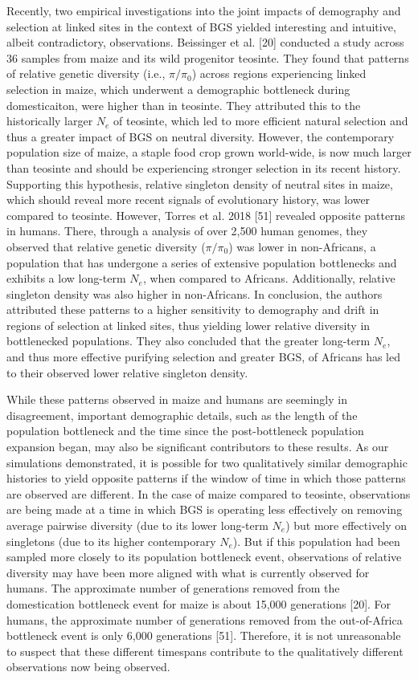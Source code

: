 \documentclass[9pt,twocolumn,twoside]{rilabRxiv}
\begin{document}
Recently, two empirical investigations into the joint impacts of
demography and selection at linked sites in the context of BGS yielded
interesting and intuitive, albeit contradictory, observations.
Beissinger et al. [20] conducted a study across 36 samples from
maize and its wild progenitor teosinte. They found that patterns of
relative genetic diversity (i.e., $\pi/\pi_0$) across regions
experiencing linked selection in maize, which underwent a demographic
bottleneck during domesticaiton, were higher than in teosinte. They
attributed this to the historically larger $N_e$ of
teosinte, which led to more efficient natural selection and thus a
greater impact of BGS on neutral diversity. However, the contemporary
population size of maize, a staple food crop grown world-wide, is now
much larger than teosinte and should be experiencing stronger selection
in its recent history. Supporting this hypothesis, relative singleton
density of neutral sites in maize, which should reveal more recent
signals of evolutionary history, was lower compared to teosinte.
However, Torres et al. 2018 [51] revealed opposite patterns in
humans. There, through a analysis of over 2,500 human genomes, they
observed that relative genetic diversity ($\pi/\pi_0$) was
lower in non-Africans, a population that has undergone a series of
extensive population bottlenecks and exhibits a low long-term
$N_e$, when compared to Africans. Additionally,
relative singleton density was also higher in non-Africans. In
conclusion, the authors attributed these patterns to a higher
sensitivity to demography and drift in regions of selection at linked
sites, thus yielding lower relative diversity in bottlenecked
populations. They also concluded that the greater long-term
$N_e$, and thus more effective purifying selection
and greater BGS, of Africans has led to their observed lower relative
singleton density.

While these patterns observed in maize and humans are seemingly in
disagreement, important demographic details, such as the length of the
population bottleneck and the time since the post-bottleneck population
expansion began, may also be significant contributors to these results.
As our simulations demonstrated, it is possible for two qualitatively
similar demographic histories to yield opposite patterns if the window
of time in which those patterns are observed are different. In the case
of maize compared to teosinte, observations are being made at a time in
which BGS is operating less effectively on removing average pairwise
diversity (due to its lower long-term $N_e$) but
more effectively on singletons (due to its higher contemporary
$N_e$). But if this population had been sampled more
closely to its population bottleneck event, observations of relative
diversity may have been more aligned with what is currently observed for
humans. The approximate number of generations removed from the
domestication bottleneck event for maize is about 15,000 generations
[20]. For humans, the approximate number of generations removed from
the out-of-Africa bottleneck event is only 6,000 generations [51].
Therefore, it is not unreasonable to suspect that these different
timespans contribute to the qualitatively different observations now
being observed.
\end{document}
